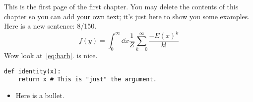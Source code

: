 \documentclass[../notebook.tex]{subfiles}
\begin{document}

This is the first page of the first chapter. You may delete the
contents of this chapter so you can add your own text; it's just here to show
you some examples. Here is a new sentence: 8/150.
\begin{equation}
  f(y)
  = \int_0^\infty \dd{x}\frac{1}{Z}\sum_{k=0}^\infty \frac{-{E(x)}^k}{k!}
  \label{eq:barb}
\end{equation}
Wow look at~\cref{eq:barb}.  is nice.
\begin{verbatim}
def identity(x):
    return x # This is "just" the argument.
\end{verbatim}
\begin{itemize}
  \item Here is a bullet.
\end{itemize}

\lipsum%
\end{document}
